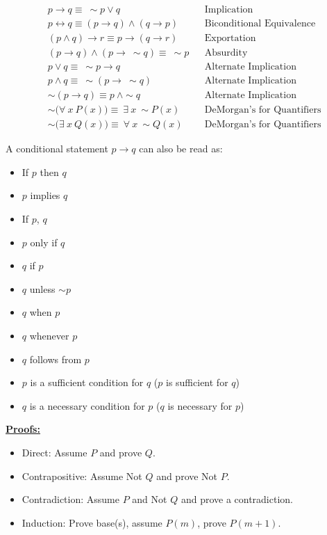 \documentclass[11pt]{article}
\begin{document}
\begin{minipage}[c]{0.4\textwidth}
\begin{align*}
    &p \rightarrow q \equiv \ \sim p \vee q &&\text{Implication} \\
    &p \leftrightarrow q \equiv (p \rightarrow q) \wedge (q \rightarrow p) &&\text{Biconditional Equivalence} \\
    &(p \wedge q) \rightarrow r \equiv p \rightarrow (q \rightarrow r) &&\text{Exportation} \\
    &(p \rightarrow q) \wedge (p \rightarrow \ \sim q) \equiv \ \sim p &&\text{Absurdity} \\
    &p \vee q \equiv \ \sim p \rightarrow q &&\text{Alternate Implication} \\
    &p \wedge q \equiv \ \sim(p \rightarrow \ \sim q) &&\text{Alternate Implication} \\
    &\sim(p \rightarrow q) \equiv p \ \wedge \sim q &&\text{Alternate Implication} \\
    &\sim \Big( \forall \ x \ P(x) \Big) \equiv \ \exists \ x \ \sim P(x) &&\text{DeMorgan's for Quantifiers} \\
    &\sim \Big( \exists \ x \ Q(x) \Big) \equiv \ \forall \ x \ \sim Q(x) &&\text{DeMorgan's for Quantifiers} 
\end{align*}
\end{minipage}
{\color{lightgray}\vline}
\begin{minipage}[t][3.1in][b]{0.4 \textwidth}
A conditional statement $p \rightarrow q$ can also be read as:
\begin{itemize}
    \item If $p$ then $q$ 
    \item $p$ implies $q$
    \item If $p$, $q$
    \item $p$ only if $q$
    \item $q$ if $p$
    \item $q$ unless $\sim p$
    \item $q$ when $p$
    \item $q$ whenever $p$
    \item $q$ follows from $p$
    \item $p$ is a sufficient condition for $q$ ($p$ is sufficient for $q$)
    \item $q$ is a necessary condition for $p$ ($q$ is necessary for $p$)
\end{itemize}

\bigskip

\underline{\bf Proofs:}
\begin{itemize}
    \item Direct: Assume $P$ and prove $Q$.
    \item Contrapositive: Assume Not $Q$ and prove Not $P$.
    \item Contradiction: Assume $P$ and Not $Q$ and prove a contradiction.
    \item Induction: Prove base(s), assume $P(m)$, prove $P(m+1)$.
\end{itemize}
\end{minipage}
\end{document}
